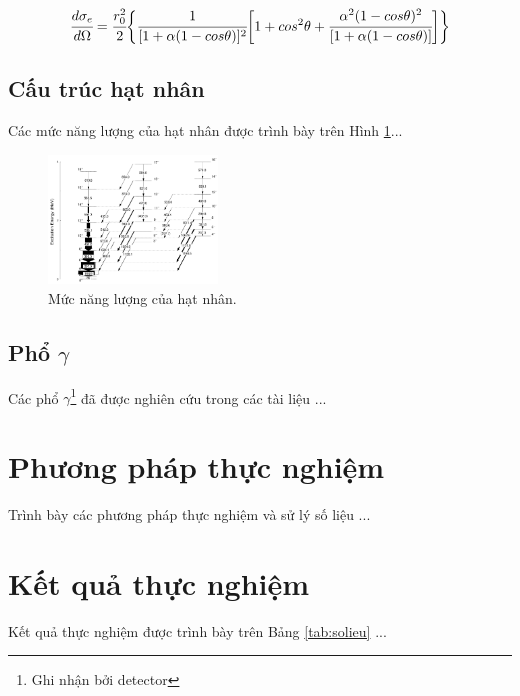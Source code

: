\documentclass[11pt, a4paper, bold, center, twoside, journal]{paper}%
\begin{document}



\begin{equation}
\cfrac{d \sigma_{e}}{d \Omega} = \cfrac{r_{0}^{2}}{2} 
\biggl\{
	\cfrac{1}{[1+\alpha(1-cos\theta)]^{2}}
	\biggl [
		1+cos^{2}\theta+\cfrac{\alpha^{2}(1-cos\theta)^{2}} {[1+\alpha(1-cos\theta)]}
	\biggr ]
\biggr\}
\label{equ:compton}
\end{equation}



\subsection{Cấu trúc hạt nhân}
Các mức năng lượng của hạt nhân được trình bày trên Hình \ref{fig:nangluong}...



\begin{figure}[!htb]
\centering
	\includegraphics[width=0.4\textwidth]{figure/156Gd.png}
	\caption{Mức năng lượng của hạt nhân.}
	\label{fig:nangluong}
\end{figure}




\subsection{Phổ $\gamma$}
Các phổ $\gamma$\footnote{Ghi nhận bởi detector} đã được nghiên cứu trong các tài liệu \cite{bib_Bazzaco, bib_Simpson, bib_ghinhanbucxa} ...



\section{Phương pháp thực nghiệm}
Trình bày các phương pháp thực nghiệm và sử lý số liệu ...


\section{Kết quả thực nghiệm}
Kết quả thực nghiệm được trình bày trên Bảng \ref{tab:solieu} ...
 
\end{document}
